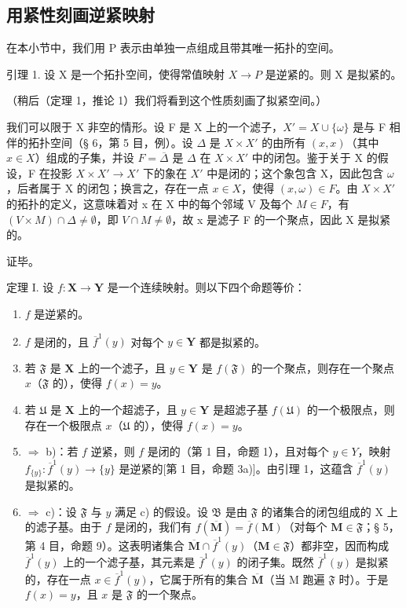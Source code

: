 \subsection{用紧性刻画逆紧映射}

在本小节中，我们用 P 表示由单独一点组成且带其唯一拓扑的空间。

引理 1. 设 X 是一个拓扑空间，使得常值映射 \(X \rightarrow P\) 是逆紧的。则 X 是拟紧的。

（稍后（定理 1，推论 1）我们将看到这个性质刻画了拟紧空间。）

我们可以限于 X 非空的情形。设 F 是 X 上的一个滤子，\(X' = X \cup \{\omega\}\) 是与 F 相伴的拓扑空间（§ 6，第 5 目，例）。设 \(\Delta\) 是 \(X \times X'\) 的由所有 \((x, x)\)（其中 \(x \in X\)）组成的子集，并设 \(F = \overline{\Delta}\) 是 \(\Delta\) 在 \(X \times X'\) 中的闭包。鉴于关于 X 的假设，F 在投影 \(X \times X' \to X'\) 下的象在 \(X'\) 中是闭的；这个象包含 X，因此包含 \(\omega\)，后者属于 X 的闭包；换言之，存在一点 \(x \in X\)，使得 \((x, \omega) \in F\)。由 \(X \times X'\) 的拓扑的定义，这意味着对 x 在 X 中的每个邻域 V 及每个 \(M \in F\)，有 \((V \times M) \cap \Delta \neq \emptyset\)，即 \(V \cap M \neq \emptyset\)，故 x 是滤子 F 的一个聚点，因此 X 是拟紧的。

证毕。

定理 I. 设 \(f: \mathbf{X} \to \mathbf{Y}\) 是一个连续映射。则以下四个命题等价：

\begin{enumerate}
\def\labelenumi{\alph{enumi})}
\item
  \(f\) 是逆紧的。
\item
  \(f\) 是闭的，且 \(\overline{f}^1(y)\) 对每个 \(y \in \mathbf{Y}\) 都是拟紧的。
\item
  若 \(\mathfrak{F}\) 是 \(\mathbf{X}\) 上的一个滤子，且 \(y\in \mathbf{Y}\) 是 \(f(\mathfrak{F})\) 的一个聚点，则存在一个聚点 \(x\)（\(\mathfrak{F}\) 的），使得 \(f(x) = y\)。
\item
  若 \(\mathfrak{U}\) 是 \(\mathbf{X}\) 上的一个超滤子，且 \(y\in \mathbf{Y}\) 是超滤子基 \(f(\mathfrak{U})\) 的一个极限点，则存在一个极限点 \(x\)（\(\mathfrak{U}\) 的），使得 \(f(x) = y\)。
\item
  \(\Longrightarrow\) b)：若 \(f\) 逆紧，则 \(f\) 是闭的（第 1 目，命题 1），且对每个 \(y \in Y\)，映射 \(f_{\{y\}}: \overline{f}^1(y) \to \{y\}\) 是逆紧的{[}第 1 目，命题 3a){]}。由引理 1，这蕴含 \(\overline{f}^1(y)\) 是拟紧的。
\item
  \(\Longrightarrow\) c)：设 \(\mathfrak{F}\) 与 \(y\) 满足 c) 的假设。设 \(\mathfrak{B}\) 是由 \(\mathfrak{F}\) 的诸集合的闭包组成的 X 上的滤子基。由于 \(f\) 是闭的，我们有 \(f(\overline{\mathbf{M}}) = \overline{f}(\mathbf{M})\)（对每个 \(\mathbf{M} \in \mathfrak{F}\)；§ 5，第 4 目，命题 9）。这表明诸集合 \(\overline{\mathbf{M}} \cap \overline{f}^1(y)\)（\(\mathbf{M} \in \mathfrak{F}\)）都非空，因而构成 \(\overline{f}^1(y)\) 上的一个滤子基，其元素是 \(\overline{f}^1(y)\) 的闭子集。既然 \(\overline{f}^1(y)\) 是拟紧的，存在一点 \(x \in \overline{f}^1(y)\)，它属于所有的集合 \(\overline{\mathbf{M}}\)（当 M 跑遍 \(\mathfrak{F}\) 时）。于是 \(f(x) = y\)，且 \(x\) 是 \(\mathfrak{F}\) 的一个聚点。
\end{enumerate}

